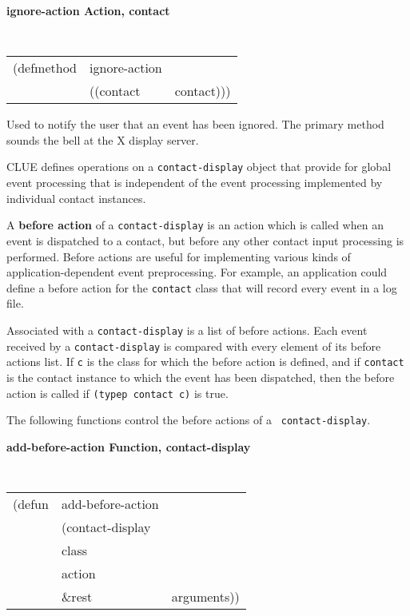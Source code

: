 {\samepage
{\large {\bf ignore-action \hfill Action, contact}}
\begin{flushright} 
\parbox[t]{6.125in}{
\tt
\begin{tabular}{lll}
\raggedright
(defmethod & ignore-action & \\
& ((contact  &contact)))
\end{tabular}
\rm

}\end{flushright}}

\begin{flushright} 
\parbox[t]{6.125in}{
Used to notify the user that an event has been ignored. The primary method
sounds the bell at the X display server. 
}\end{flushright}

CLUE defines operations on a {\tt contact-display} object that provide for global
event processing that is independent of the event processing implemented by individual
contact instances.


A {\bf before action}
 of a {\tt contact-display} is an action which is called
when an event is dispatched to a contact, but before any other contact input
processing is performed.  Before actions are useful for implementing
various kinds of application-dependent event preprocessing. For example, an
application could define a before action for the {\tt contact} class that will
record every event in a log file. 

Associated with a {\tt contact-display} is a list of before actions. 
Each event received by a {\tt contact-display} is compared with every element of
its before actions list.  If {\tt c} is the class for which the before
action is defined, and if {\tt contact} is the contact instance to which the
event has been dispatched, then the before action is called if {\tt (typep
contact c)} is true.

The following functions control the before actions of a {\tt
contact-display}.

\pagebreak
{\large {\bf add-before-action \hfill Function, contact-display}} 
\begin{flushright} \parbox[t]{6.125in}{
\tt
\begin{tabular}{lll}
\raggedright
(defun & add-before-action & \\ 
& (contact-display\\
& class\\
& action\\
& \&rest & arguments))
\end{tabular}
\rm

}\end{flushright}




